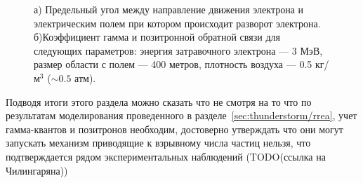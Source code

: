 \begin{figure}[t]
    \begin{center}
        \begin{minipage}[h]{0.49\linewidth}
        \end{minipage}
        \hfill
        \begin{minipage}[h]{0.49\linewidth}
        \end{minipage}
        \caption{а) Предельный угол между направление движения электрона и электрическим полем при котором происходит разворот электрона. б)Коэффициент гамма и позитронной обратной связи для следующих параметров: энергия затравочного электрона --- 3 МэВ, размер области с полем --- 400 метров, плотность воздуха --- 0.5 кг/м$^3$ ($\sim 0.5$ атм).}
    \end{center}
    \label{fig:storm:ayss2018}
\end{figure}
Подводя итоги этого раздела можно сказать что не смотря на то что по результатам моделирования проведенного в разделе~\ref{sec:thunderstorm/rrea}, учет гамма-квантов и позитронов необходим, достоверно утверждать что они могут запускать механизм приводящие к взрывному числа частиц нельзя, что подтверждается рядом экспериментальных наблюдений (TODO(ссылка на Чилингаряна)) 